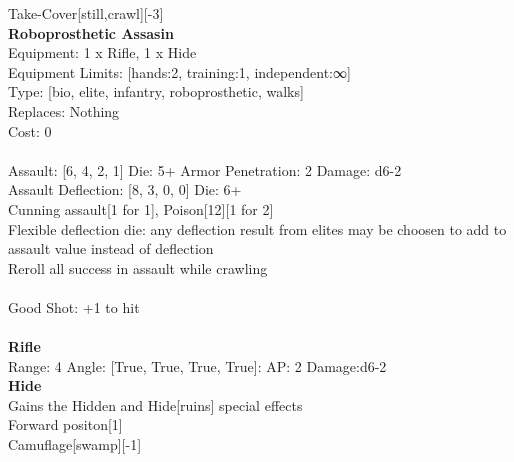 \noindent Take-Cover[still,crawl][-3]\\ 


{\bf Roboprosthetic Assasin } \\
Equipment: 1 x Rifle, 1 x Hide \\
Equipment Limits: [hands:2, training:1, independent:∞] \\
Type: [bio, elite, infantry, roboprosthetic, walks] \\
Replaces: Nothing \\
Cost: 0\\
\ \\
Assault: [6, 4, 2, 1] Die: 5+ Armor Penetration: 2 Damage: d6-2 \\
Assault Deflection: [8, 3, 0, 0] Die: 6+\\
\indent Cunning assault[1 for 1], Poison[12][1 for 2]\\ 
Flexible deflection die: any deflection result from elites may be choosen to add to assault value instead of deflection\\ 
Reroll all success in assault while crawling\\ 
 
\ \\
Good Shot: +1 to hit\\ 

\ \\
{\bf Rifle } \\



Range: 4  Angle: [True, True, True, True]: AP: 2 Damage:d6-2 \\




{\bf Hide } \\

Gains the Hidden and Hide[ruins] special effects\\ 
Forward positon[1]\\ 
Camuflage[swamp][-1]\\ 





 
\ \\



